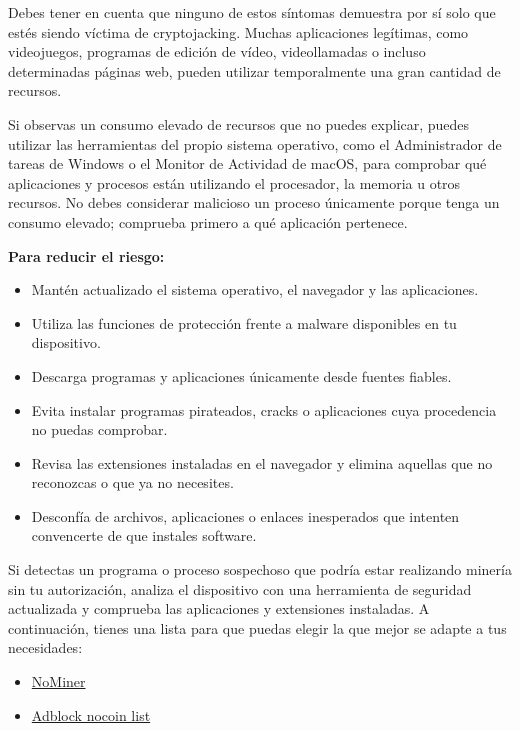 \documentclass[
  spanish,
  a4paper,
  openany]{book}
\begin{document}
Debes tener en cuenta que ninguno de estos síntomas demuestra por sí solo que estés siendo víctima de cryptojacking. Muchas aplicaciones legítimas, como videojuegos, programas de edición de vídeo, videollamadas o incluso determinadas páginas web, pueden utilizar temporalmente una gran cantidad de recursos.

Si observas un consumo elevado de recursos que no puedes explicar, puedes utilizar las herramientas del propio sistema operativo, como el Administrador de tareas de Windows o el Monitor de Actividad de macOS, para comprobar qué aplicaciones y procesos están utilizando el procesador, la memoria u otros recursos. No debes considerar malicioso un proceso únicamente porque tenga un consumo elevado; comprueba primero a qué aplicación pertenece.

\textbf{Para reducir el riesgo:}

\begin{itemize}
\item
  Mantén actualizado el sistema operativo, el navegador y las aplicaciones.
\item
  Utiliza las funciones de protección frente a malware disponibles en tu dispositivo.
\item
  Descarga programas y aplicaciones únicamente desde fuentes fiables.
\item
  Evita instalar programas pirateados, cracks o aplicaciones cuya procedencia no puedas comprobar.
\item
  Revisa las extensiones instaladas en el navegador y elimina aquellas que no reconozcas o que ya no necesites.
\item
  Desconfía de archivos, aplicaciones o enlaces inesperados que intenten convencerte de que instales software.
\end{itemize}

Si detectas un programa o proceso sospechoso que podría estar realizando minería sin tu autorización, analiza el dispositivo con una herramienta de seguridad actualizada y comprueba las aplicaciones y extensiones instaladas. A continuación, tienes una lista para que puedas elegir la que mejor se adapte a tus necesidades:

\begin{itemize}
\item
  \href{https://chrome.google.com/webstore/detail/nominer-block-coin-miners/jfnangjojcioomickmmnfmiadkfhcdmd}{NoMiner}
\item
  \href{https://github.com/hoshsadiq/adblock-nocoin-list}{Adblock nocoin list}
\end{itemize}
\end{document}
